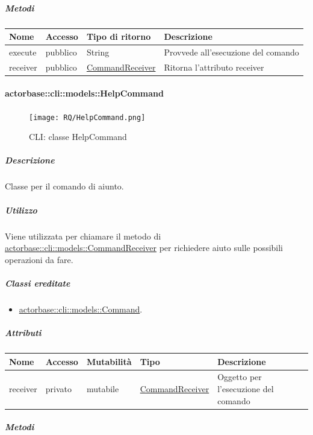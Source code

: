 \documentclass{scalatekids-article}
\begin{document}
\subparagraph{Metodi}

\begin{tabular}{| p{3cm} | p{1.5cm} | p{3.5cm} | p{9cm} |}
  \hline
  Nome & Accesso & Tipo di ritorno & Descrizione\\
  \hline
  execute & pubblico & String & Provvede all'esecuzione del comando\\
  \hline
  receiver & pubblico & \hyperref[sec:actorbase::cli::models::CommandReceiver]{CommandReceiver} & Ritorna l'attributo receiver\\
  \hline
\end{tabular}


\paragraph{actorbase::cli::models::HelpCommand}
\label{sec:actorbase::cli::models::HelpCommand}

\begin{figure}[H]
  \begin{center}
    \texttt{[image: RQ/HelpCommand.png]}
    \caption{CLI: classe HelpCommand}
  \end{center}
\end{figure}

\subparagraph{Descrizione}

Classe per il comando di aiunto.

\subparagraph{Utilizzo}
Viene utilizzata per chiamare il metodo di
\hyperref[sec:actorbase::cli::models::CommandReceiver]{actorbase::cli::models::CommandReceiver} per richiedere aiuto sulle possibili operazioni da fare.

\subparagraph{Classi ereditate}
\begin{itemize}
\item \hyperref[sec:actorbase::cli::models::Command]{actorbase::cli::models::Command}.
\end{itemize}

\subparagraph{Attributi}

\begin{tabular}{| p{1cm} | p{1.5cm} | p{2cm} | p{4cm} | p{8.5cm} |}
  \hline
  Nome & Accesso & Mutabilità & Tipo & Descrizione\\
  \hline
  receiver & privato & mutabile & \hyperref[sec:actorbase::cli::models::CommandReceiver]{CommandReceiver} & Oggetto per l'esecuzione del comando \\
  \hline
\end{tabular}

\subparagraph{Metodi}
\end{document}
